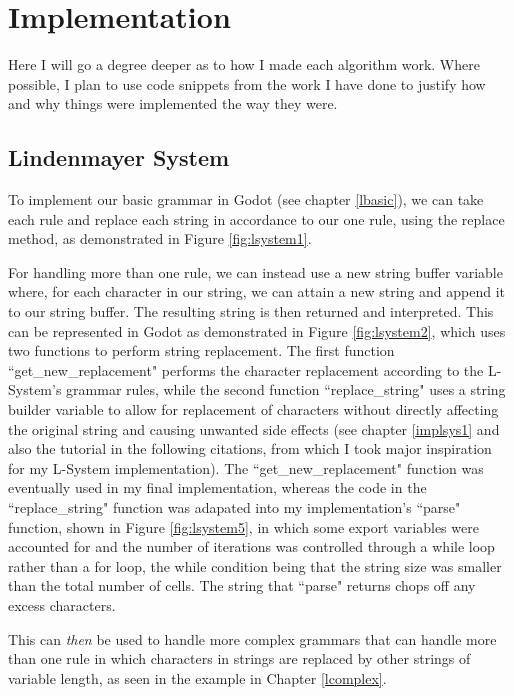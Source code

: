 \chapter{Implementation} \label{Implementation}


Here I will go a degree deeper as to how I made each algorithm work. Where possible, I plan to use code snippets from the work I have done to justify how and why things were implemented the way they were.

\section{Lindenmayer System} \label{implsys2}

To implement our basic grammar in Godot (see chapter \ref{lbasic}), we can take each rule and replace each string in accordance to our one rule, using the replace method, as demonstrated in Figure \ref{fig:lsystem1}.

For handling more than one rule, we can instead use a new string buffer variable where, for each character in our string, we can attain a new string and append it to our string buffer. The resulting string is then returned and interpreted. This can be represented in Godot as demonstrated in Figure \ref{fig:lsystem2}, which uses two functions to perform string replacement. The first function ``get\_new\_replacement" performs the character replacement according to the L-System's grammar rules, while the second function ``replace\_string" uses a string builder variable to allow for replacement of characters without directly affecting the original string and causing unwanted side effects (see chapter \ref{implsys1} and also the tutorial in the following citations\cite{codatGD3LSystemYT}\cite{codatGD3LSystemGH}\cite{codatGD4LSystemGH}, from which I took major inspiration for my L-System implementation). The ``get\_new\_replacement" function was eventually used in my final implementation, whereas the code in the ``replace\_string" function was adapated into my implementation's ``parse" function, shown in Figure \ref{fig:lsystem5}, in which some export variables were accounted for and the number of iterations was controlled through a while loop rather than a for loop, the while condition being that the string size was smaller than the total number of cells. The string that ``parse" returns chops off any excess characters.

This can \textit{then} be used to handle more complex grammars that can handle more than one rule in which characters in strings are replaced by other strings of variable length, as seen in the example in Chapter \ref{lcomplex}.


